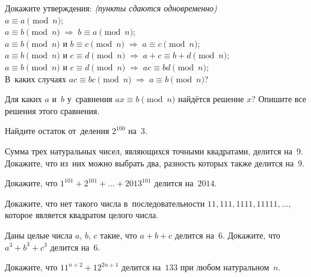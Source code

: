 \begin{problems}

\item
Докажите утверждения: \emph{(пункты сдаются одновременно)}
\\
\sp $a \equiv a \pmod n$; %
\\
\sp
\(
    a \equiv b \pmod n
\;\Rightarrow\;
    b \equiv a \pmod n
\);
\\
\sp
\(
    a \equiv b \pmod n \text{ и } b \equiv c \pmod n
\;\Rightarrow\;
    a \equiv c \pmod n
\);
\\
\sp
\(
    a \equiv b \pmod n \text{ и } c \equiv d \pmod n
\;\Rightarrow\;
    a + c \equiv b + d \pmod n
\);
\\
\sp
\(
    a \equiv b \pmod n \text{ и } c \equiv d \pmod n
\;\Rightarrow\;
    a c \equiv b d \pmod n
\);
\\
\sp%
В~каких случаях
\(
    a c \equiv b c \pmod n
\;\Rightarrow\;
    a\equiv b \pmod n
\)?

\item
Для каких $a$ и~$b$ у~сравнения $ax \equiv b \pmod n$ найдётся решение $x$?
Опишите все решения этого сравнения.

\item
Найдите остаток от~деления $2^{100}$ на~$3$.

\item
Сумма трех натуральных чисел, являющихся точными квадратами, делится на~9.
Докажите, что из~них можно выбрать два, разность которых также делится на~9.

\item
Докажите, что $1^{101} + 2^{101} + \dots + 2013^{101}$ делится на~$2014$.

\item
Докажите, что нет такого числа в~последовательности
$11, 111, 1111, 11111, \ldots$,
которое является квадратом целого числа. 

\item
Даны целые числа $a$, $b$, $c$ такие, что $a + b + c$ делится на~$6$.
Докажите, что $a^3 + b^3 + c^3$ делится на~$6$.

\item
Докажите, что $11^{n+2} + 12^{2n + 1}$ делится на~$133$ при любом
натуральном~$n$.

\end{problems}

